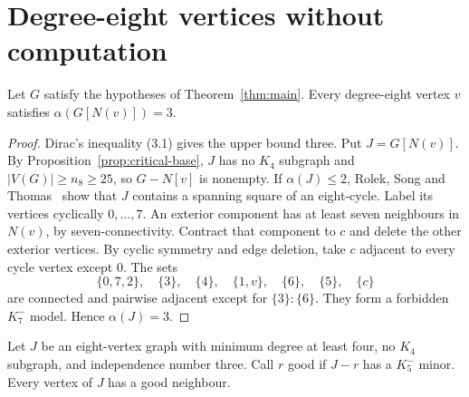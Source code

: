 \section{Degree-eight vertices without computation}\label{sec:degree-eight}

\begin{lemma}\label{lem:independent-triple}
Let $G$ satisfy the hypotheses of Theorem~\ref{thm:main}.  Every
degree-eight vertex $v$ satisfies $\alpha(G[N(v)])=3$.
\end{lemma}

\begin{proof}
Dirac's inequality (3.1) gives the upper bound three.  Put $J=G[N(v)]$.
By Proposition~\ref{prop:critical-base}, $J$ has no $K_4$ subgraph and
$|V(G)|\geq n_8\geq25$, so $G-N[v]$ is nonempty.  If $\alpha(J)\leq2$,
Rolek, Song and Thomas~\cite[Lemma~2.1]{RolekSongThomas2022} show that $J$
contains a spanning square of an eight-cycle.  Label its vertices
cyclically $0,\ldots,7$.  An exterior component has at least seven
neighbours in $N(v)$, by seven-connectivity.  Contract that component to
$c$ and delete the other exterior vertices.  By cyclic symmetry and edge
deletion, take $c$ adjacent to every cycle vertex except $0$.  The sets
\[
       \{0,7,2\},\quad\{3\},\quad\{4\},\quad\{1,v\},
       \quad\{6\},\quad\{5\},\quad\{c\}
\]
are connected and pairwise adjacent except for $\{3\}:\{6\}$.  They
form a forbidden $K_7^{-}$ model.  Hence $\alpha(J)=3$.
\end{proof}

\begin{lemma}\label{lem:good-deletion}
Let $J$ be an eight-vertex graph with minimum degree at least four, no
$K_4$ subgraph, and independence number three.  Call $r$ good if $J-r$
has a $K_5^{-}$ minor.  Every vertex of $J$ has a good neighbour.
\end{lemma}

